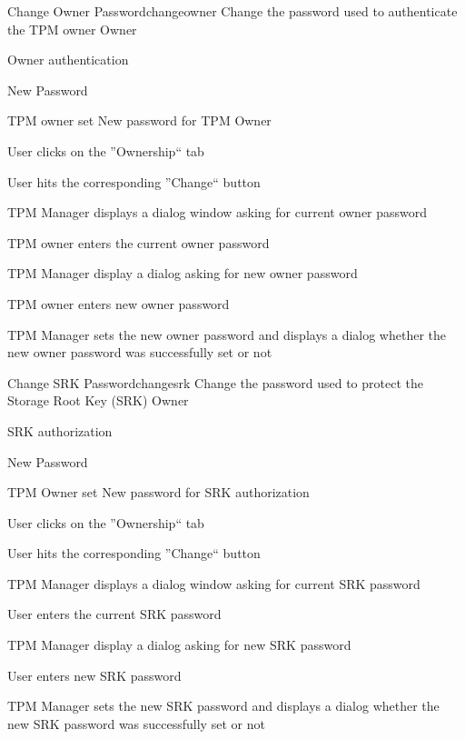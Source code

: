 \documentclass[
  american        %
]{sirrixreport}
\begin{document}
\begin{usecase}{Change Owner Password}{changeowner}
\ucdesc Change the password used to authenticate the TPM owner
\ucactors Owner
\ucinclude 
   \begin{compactitem}
      \item Owner authentication 
      \item New Password 
   \end{compactitem}
\ucprecond TPM owner set
\ucpostcond New password for TPM Owner
\ucnormal 
 \item User clicks on the ''Ownership`` tab
 \item User hits the corresponding ''Change`` button
 \item TPM Manager displays a dialog window asking for current owner password
 \item TPM owner enters the current owner password
 \item TPM Manager display a dialog asking for new owner password
 \item TPM owner enters new owner password
 \item TPM Manager sets the new owner password and displays a dialog whether the new owner password was successfully set or not 
\ucendflow 
\end{usecase}
\clearpage

\begin{usecase}{Change SRK Password}{changesrk}
\ucdesc Change the password used to protect the Storage Root Key (SRK)
\ucactors Owner
\ucinclude 
   \begin{compactitem}
      \item SRK authorization 
      \item New Password 
   \end{compactitem}
\ucprecond TPM Owner set
\ucpostcond New password for SRK authorization
\ucnormal 
 \item User clicks on the ''Ownership`` tab
 \item User hits the corresponding ''Change`` button
 \item TPM Manager displays a dialog window asking for current SRK password
 \item User enters the current SRK password
 \item TPM Manager display a dialog asking for new SRK password
 \item User enters new SRK password
 \item TPM Manager sets the new SRK password and displays a dialog whether the new SRK password was successfully set or not 
\ucendflow 
\end{usecase}
\clearpage
\end{document}
